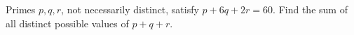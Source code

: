 Primes $p,q,r$, not necessarily distinct, satisfy $p+6q+2r=60$. Find the sum of all distinct possible values of $p+q+r$.
